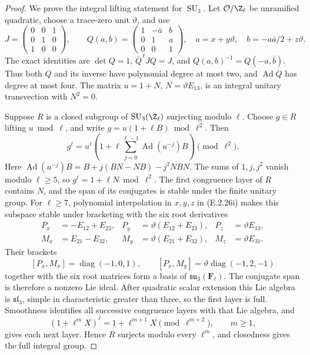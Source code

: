 \begin{proof}
We prove the integral lifting statement for \(\operatorname{SU}_3\).
Let \(\mathcal O/\Z_\ell\) be unramified quadratic, choose
a trace-zero unit \(\vartheta\), and use
\[
 J=\begin{pmatrix}0&0&1\\0&1&0\\1&0&0\end{pmatrix},\qquad
 Q(a,b)=\begin{pmatrix}1&-\bar a&b\\0&1&a\\0&0&1\end{pmatrix},
 \quad a=x+y\vartheta,\quad
 b=-a\bar a/2+z\vartheta.
 \tag{E.2.26i}
\]
The exact identities are
\(\det Q=1\), \(\bar Q^{\,t}JQ=J\), and
\(Q(a,b)^{-1}=Q(-a,\bar b)\). Thus both \(Q\) and
its inverse have polynomial degree at most two, and
\(\operatorname{Ad}Q\) has degree at most four.
The matrix \(u=1+N\), \(N=\vartheta E_{13}\), is an
integral unitary transvection with \(N^2=0\).

Suppose \(R\) is a closed subgroup of
\(\operatorname{SU}_3(\Z_\ell)\) surjecting modulo \(\ell\).
Choose \(g\in R\) lifting \(u\bmod\ell\), and write
\(g=u(1+\ell B)\bmod\ell^2\). Then
\[
 g^\ell=u^\ell\left(1+\ell
       \sum_{j=0}^{\ell-1}\operatorname{Ad}(u^{-j})B\right)
       \pmod{\ell^2}.
\]
Here
\(\operatorname{Ad}(u^{-j})B
 =B+j(BN-NB)-j^2NBN\).
The sums of \(1,j,j^2\) vanish modulo \(\ell\geq5\),
so \(g^\ell=1+\ell N\bmod\ell^2\).
The first congruence layer of \(R\) contains \(N\), and
the span of its conjugates is stable under the finite unitary
group. For \(\ell\geq7\), polynomial interpolation in
\(x,y,z\) in (E.2.26i) makes this subspace stable under
bracketing with the six root derivatives
\[
\begin{aligned}
 P_x&=-E_{12}+E_{23},&
 P_y&=\vartheta(E_{12}+E_{23}),&P_z&=\vartheta E_{13},\\
 M_x&=E_{21}-E_{32},&
 M_y&=\vartheta(E_{21}+E_{32}),&M_z&=\vartheta E_{31}.
\end{aligned}
\]
Their brackets
\[
 [P_x,M_x]=\operatorname{diag}(-1,0,1),\qquad
 [P_x,M_y]=\vartheta\operatorname{diag}(-1,2,-1)
\]
together with the six root matrices form a basis of
\(\mathfrak{su}_3(\mathbf F_\ell)\).
The conjugate span is therefore a nonzero Lie ideal.
After quadratic scalar extension this Lie algebra is
\(\mathfrak{sl}_3\), simple in characteristic greater
than three, so the first layer is full. Smoothness identifies
all successive congruence layers with that Lie algebra, and
\[
 (1+\ell^mX)^\ell
      =1+\ell^{m+1}X\pmod{\ell^{m+2}},\qquad m\geq1,
 \tag{E.2.26j}
\]
gives each next layer. Hence \(R\) surjects modulo every
\(\ell^m\), and closedness gives the full integral group.


\end{proof}
